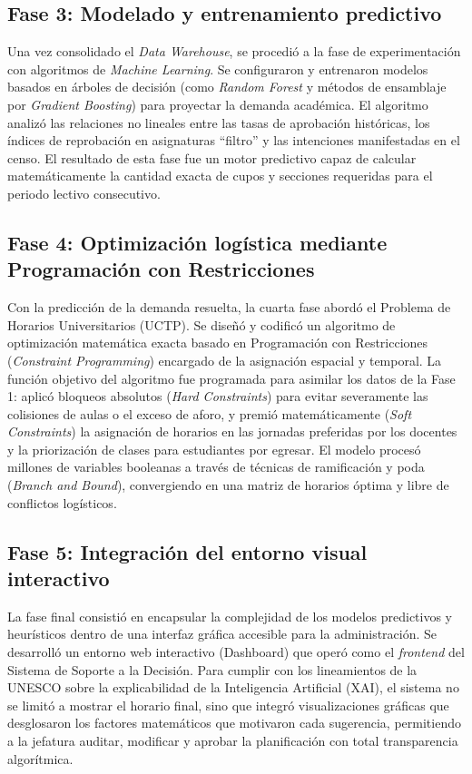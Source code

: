 \subsection{Fase 3: Modelado y entrenamiento predictivo}
Una vez consolidado el \textit{Data Warehouse}, se procedió a la fase de experimentación con algoritmos de \textit{Machine Learning}. Se configuraron y entrenaron modelos basados en árboles de decisión (como \textit{Random Forest} y métodos de ensamblaje por \textit{Gradient Boosting}) para proyectar la demanda académica. El algoritmo analizó las relaciones no lineales entre las tasas de aprobación históricas, los índices de reprobación en asignaturas ``filtro'' y las intenciones manifestadas en el censo. El resultado de esta fase fue un motor predictivo capaz de calcular matemáticamente la cantidad exacta de cupos y secciones requeridas para el periodo lectivo consecutivo.

\subsection{Fase 4: Optimización logística mediante Programación con Restricciones}
Con la predicción de la demanda resuelta, la cuarta fase abordó el Problema de Horarios Universitarios (UCTP). Se diseñó y codificó un algoritmo de optimización matemática exacta basado en Programación con Restricciones (\textit{Constraint Programming}) encargado de la asignación espacial y temporal. La función objetivo del algoritmo fue programada para asimilar los datos de la Fase 1: aplicó bloqueos absolutos (\textit{Hard Constraints}) para evitar severamente las colisiones de aulas o el exceso de aforo, y premió matemáticamente (\textit{Soft Constraints}) la asignación de horarios en las jornadas preferidas por los docentes y la priorización de clases para estudiantes por egresar. El modelo procesó millones de variables booleanas a través de técnicas de ramificación y poda (\textit{Branch and Bound}), convergiendo en una matriz de horarios óptima y libre de conflictos logísticos.

\subsection{Fase 5: Integración del entorno visual interactivo}
La fase final consistió en encapsular la complejidad de los modelos predictivos y heurísticos dentro de una interfaz gráfica accesible para la administración. Se desarrolló un entorno web interactivo (Dashboard) que operó como el \textit{frontend} del Sistema de Soporte a la Decisión. Para cumplir con los lineamientos de la UNESCO sobre la explicabilidad de la Inteligencia Artificial (XAI), el sistema no se limitó a mostrar el horario final, sino que integró visualizaciones gráficas que desglosaron los factores matemáticos que motivaron cada sugerencia, permitiendo a la jefatura auditar, modificar y aprobar la planificación con total transparencia algorítmica.

